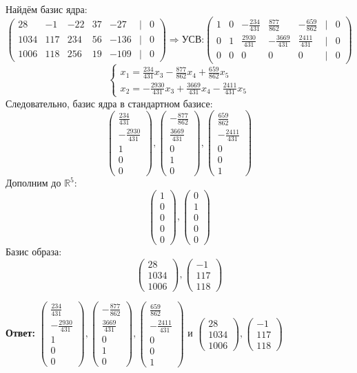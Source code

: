 \documentclass[a4paper]{article}
\newcommand{\mat}[1]{\begin{pmatrix} #1 \end{pmatrix}}
\newcommand{\case}[1]{\begin{cases} #1 \end{cases}}
\renewcommand{\r}{\Rightarrow}
\newcommand{\RR}{\mathbb{R}}
\begin{document}
\begin{enumerate}
\begin{enumerate}
        Найдём базис ядра:
        $$
        \mat{28 & -1 & -22 & 37 & -27& | & 0 \\
        1034 & 117 & 234 & 56 & -136 & | & 0\\
        1006 & 118 & 256 & 19 & -109& | & 0} \r \text{УСВ:}
        \mat{1 & 0 & -\frac{234}{431} & \frac{877}{862} & -\frac{659}{862}& | & 0 \\
        0 & 1 & \frac{2930}{431} & -\frac{3669}{431} & \frac{2411}{431}& | & 0 \\
        0 & 0 & 0 & 0 & 0& | & 0}$$
        $$\case{
            x_1 = \frac{234}{431}x_3-\frac{877}{862}x_4+\frac{659}{862}x_5\\
            x_2 = -\frac{2930}{431}x_3 + \frac{3669}{431}x_4-\frac{2411}{431}x_5
            }$$
        Следовательно, базис ядра в стандартном базисе:
        $$\mat{\frac{234}{431}\\-\frac{2930}{431}\\1\\0\\0},
        \mat{-\frac{877}{862}\\\frac{3669}{431}\\0\\1\\0},
        \mat{\frac{659}{862}\\-\frac{2411}{431}\\0\\0\\1} $$
        Дополним до $\RR^5$:
        $$\mat{1\\0\\0\\0\\0}, \mat{0\\1\\0\\0\\0}$$
        Базис образа:
        $$\mat{28\\1034\\1006}, \mat{-1\\117\\118}$$
        
        \textbf{Ответ: } $\mat{\frac{234}{431}\\-\frac{2930}{431}\\1\\0\\0},
        \mat{-\frac{877}{862}\\\frac{3669}{431}\\0\\1\\0},
        \mat{\frac{659}{862}\\-\frac{2411}{431}\\0\\0\\1} $ и 
        $\mat{28\\1034\\1006}, \mat{-1\\117\\118}$\\
    \end{enumerate}


\end{enumerate}
\end{document}
